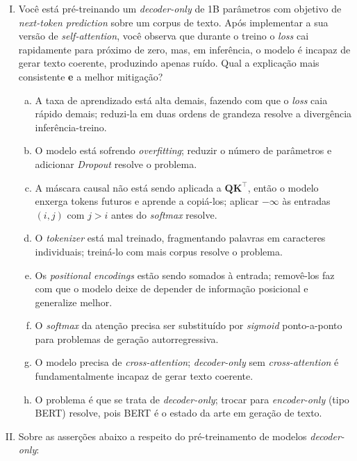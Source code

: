 \documentclass{dlproblemset}
\begin{document}
\begin{enumerate}[I)]
\item Você está pré-treinando um \textit{decoder-only} de 1B parâmetros com objetivo de \textit{next-token prediction} sobre um corpus de texto. Após implementar a sua versão de \textit{self-attention}, você observa que durante o treino o \textit{loss} cai rapidamente para próximo de zero, mas, em inferência, o modelo é incapaz de gerar texto coerente, produzindo apenas ruído. Qual a explicação mais consistente \textbf{e} a melhor mitigação?
\begin{enumerate}[a)]
    \item A taxa de aprendizado está alta demais, fazendo com que o \textit{loss} caia rápido demais; reduzi-la em duas ordens de grandeza resolve a divergência inferência-treino.
    \item O modelo está sofrendo \textit{overfitting}; reduzir o número de parâmetros e adicionar \textit{Dropout} resolve o problema.
    \item A máscara causal não está sendo aplicada a $\mathbf{Q}\mathbf{K}^\top$, então o modelo enxerga tokens futuros e aprende a copiá-los; aplicar $-\infty$ às entradas $(i, j)$ com $j > i$ antes do \textit{softmax} resolve.
    \item O \textit{tokenizer} está mal treinado, fragmentando palavras em caracteres individuais; treiná-lo com mais corpus resolve o problema.
    \item Os \textit{positional encodings} estão sendo somados à entrada; removê-los faz com que o modelo deixe de depender de informação posicional e generalize melhor.
    \item O \textit{softmax} da atenção precisa ser substituído por \textit{sigmoid} ponto-a-ponto para problemas de geração autorregressiva.
    \item O modelo precisa de \textit{cross-attention}; \textit{decoder-only} sem \textit{cross-attention} é fundamentalmente incapaz de gerar texto coerente.
    \item O problema é que se trata de \textit{decoder-only}; trocar para \textit{encoder-only} (tipo BERT) resolve, pois BERT é o estado da arte em geração de texto.
\end{enumerate}

\item Sobre as asserções abaixo a respeito do pré-treinamento de modelos \textit{decoder-only}:


\end{enumerate}
\end{document}
